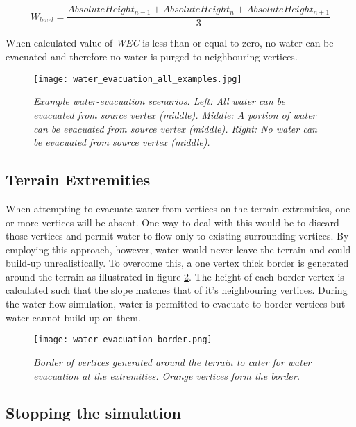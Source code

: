 \begin{equation} \label{eq:water_level_calc}
	W_{level} = \frac{AbsoluteHeight_{n-1} + AbsoluteHeight_{n} + AbsoluteHeight_{n+1}}{3}
\end{equation}

When calculated value of \textit{WEC} is less than or equal to zero, no water can be evacuated and therefore no water is purged to neighbouring vertices.

\begin{figure}
\center
	\texttt{[image: water\_evacuation\_all\_examples.jpg]}
	\caption{ \textit{Example water-evacuation scenarios. Left: All water can be evacuated from source vertex (middle). Middle: A portion of water can be evacuated from source vertex (middle). Right: No water can be evacuated from source vertex (middle).}}
	\label{fig:evacuation_scenarios}
\end{figure}

\subsection{Terrain Extremities} \label{subsec:terrain_extremeties}

When attempting to evacuate water from vertices on the terrain extremities, one or more vertices will be absent. One way to deal with this would be to discard those vertices and permit water to flow only to existing surrounding vertices. By employing this approach, however, water would never leave the terrain and could build-up unrealistically. To overcome this, a one vertex thick border is generated around the terrain as illustrated in figure \ref{fig:evacuation_border}. The height of each border vertex is calculated such that the slope matches that of it's neighbouring vertices. During the water-flow simulation, water is permitted to evacuate to border vertices but water cannot build-up on them.

\begin{figure}
\center
	\texttt{[image: water\_evacuation\_border.png]}
	\caption{ \textit{Border of vertices generated around the terrain to cater for water evacuation at the extremities. Orange vertices form the border.} }
	\label{fig:evacuation_border}
\end{figure}

\subsection{Stopping the simulation} \label{subsec:stopping_water_flow}


